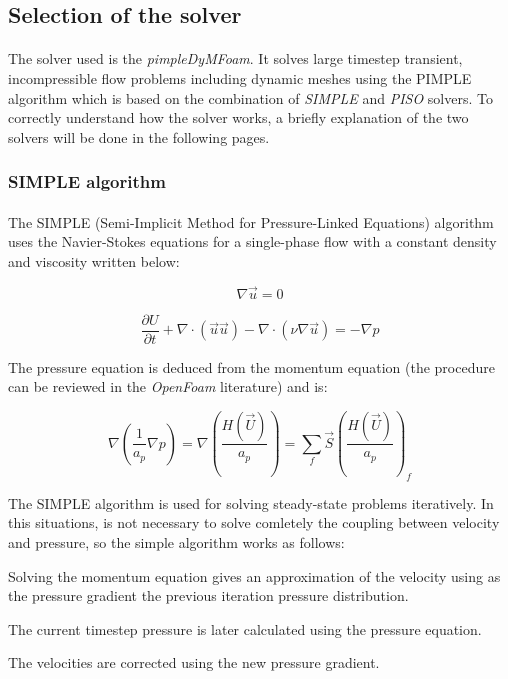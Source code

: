 \subsection{Selection of the solver}

\paragraph{}The solver used is the \textit{pimpleDyMFoam}. It solves large timestep transient, incompressible flow problems including dynamic meshes using the PIMPLE algorithm which is based on the combination of \emph{SIMPLE} and \emph{PISO} solvers. To correctly understand how the solver works, a briefly explanation of the two solvers will be done in the following pages.

\subsubsection{SIMPLE algorithm}


\paragraph{}The SIMPLE (Semi-Implicit Method for Pressure-Linked Equations) algorithm uses the Navier-Stokes equations for a single-phase flow with a constant density and viscosity written below:

\begin{equation}
\nabla \vec{u} = 0
\end{equation}

\begin{equation}
\frac{\partial U}{\partial t} + \nabla ·(\vec{u}\vec{u}) -\nabla·(\nu\nabla\vec{u})= -\nabla p
\end{equation}

The pressure equation is deduced from the momentum equation (the procedure can be reviewed in the \textit{OpenFoam} literature) and is:

\begin{equation}
\nabla\left(\frac{1}{a_p}\nabla p \right )=\nabla\left(\frac{H(\vec{U})}{a_p}\right )=\sum_{f}\vec{S}\left(\frac{H(\vec{U})}{a_p}\right )_f
\end{equation}

The SIMPLE algorithm is used for solving steady-state problems iteratively. In this situations, is not necessary to solve comletely the coupling between velocity and pressure, so the simple algorithm works as follows:
\begin{list}
\item Solving the momentum equation gives an approximation of the velocity using as the pressure gradient the previous iteration pressure distribution.
\item The current timestep pressure is later calculated using the pressure equation. 
\item The velocities are corrected using the new pressure gradient.
\end{list}

